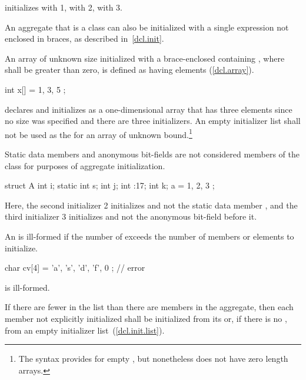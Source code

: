 initializes
with 1,
with 2,
with 3.
\exitexample

\pnum
An aggregate that is a class can also be initialized with a single
expression not enclosed in braces, as described in~\ref{dcl.init}.

\pnum
An array of unknown size initialized with a
brace-enclosed
containing
,
where
shall be greater than zero, is defined as having
elements (\ref{dcl.array}).
\enterexample

\begin{codeblock}
int x[] = { 1, 3, 5 };
\end{codeblock}

declares and initializes
as a one-dimensional array that has three elements
since no size was specified and there are three initializers.
\exitexample
An empty initializer list
\tcode{\{\}}
shall not be used as the 
for an array of unknown bound.\footnote{The syntax provides for empty
,
but nonetheless \Cpp does not have zero length arrays.}

\pnum
Static data members and anonymous bit-fields are not considered
members of the class for purposes of aggregate initialization.
\enterexample

\begin{codeblock}
struct A {
  int i;
  static int s;
  int j;
  int :17;
  int k;
} a = { 1, 2, 3 };
\end{codeblock}

Here, the second initializer 2 initializes
and not the static data member
, and the third initializer 3 initializes 
and not the anonymous bit-field before it.
\exitexample

\pnum
An
is ill-formed if the number of
exceeds the number of members or elements to initialize.
\enterexample

\begin{codeblock}
char cv[4] = { 'a', 's', 'd', 'f', 0 };     // error
\end{codeblock}

is ill-formed.
\exitexample

\pnum
If there are fewer  in the list than there
are members in the aggregate, then each member not explicitly initialized
shall be initialized from its  or,
if there is no , from an empty
initializer list~(\ref{dcl.init.list}).
\enterexample

